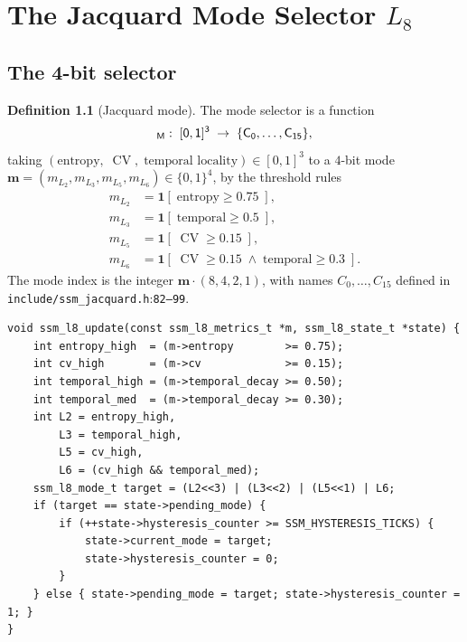 \documentclass[11pt,letterpaper,openany]{book}
\theoremstyle{definition}
\newtheorem{definition}{Definition}[chapter]
\theoremstyle{plain}
\newcommand{\CV}{\operatorname{CV}}
\newcommand{\Loop}[1]{L_{#1}}
\newcommand{\sourceref}[2]{\texttt{#1}:\texttt{#2}}
\begin{document}
\chapter{The Jacquard Mode Selector $\Loop{8}$}
\label{ch:jacquard}

\section{The 4-bit selector}

\begin{definition}[Jacquard mode]\label{def:jacquard}
The mode selector is a function
\[
  \sf_M:\;[0,1]^3 \;\to\; \{C_0,\dots,C_{15}\},
\]
taking $(\text{entropy},\;\CV,\;\text{temporal locality})\in [0,1]^3$ to a
$4$-bit mode $\mathbf{m} = (m_{\Loop{2}},m_{\Loop{3}},m_{\Loop{5}},m_{\Loop{6}})
\in\{0,1\}^4$, by the threshold rules
\begin{align*}
  m_{\Loop{2}} &= \mathbf{1}[\;\text{entropy} \ge 0.75\;],\\
  m_{\Loop{3}} &= \mathbf{1}[\;\text{temporal} \ge 0.5\;],\\
  m_{\Loop{5}} &= \mathbf{1}[\;\CV \ge 0.15\;],\\
  m_{\Loop{6}} &= \mathbf{1}[\;\CV \ge 0.15\;\wedge\;\text{temporal} \ge 0.3\;].
\end{align*}
The mode index is the integer
$\mathbf{m}\cdot(8,4,2,1)$, with names $C_0,\dots,C_{15}$ defined in
\sourceref{include/ssm\_jacquard.h}{82--99}.
\end{definition}

\begin{lstlisting}[caption={Mode update
  (\texttt{src/ssm\_jacquard.c}:65--110).}]
void ssm_l8_update(const ssm_l8_metrics_t *m, ssm_l8_state_t *state) {
    int entropy_high  = (m->entropy        >= 0.75);
    int cv_high       = (m->cv             >= 0.15);
    int temporal_high = (m->temporal_decay >= 0.50);
    int temporal_med  = (m->temporal_decay >= 0.30);
    int L2 = entropy_high,
        L3 = temporal_high,
        L5 = cv_high,
        L6 = (cv_high && temporal_med);
    ssm_l8_mode_t target = (L2<<3) | (L3<<2) | (L5<<1) | L6;
    if (target == state->pending_mode) {
        if (++state->hysteresis_counter >= SSM_HYSTERESIS_TICKS) {
            state->current_mode = target;
            state->hysteresis_counter = 0;
        }
    } else { state->pending_mode = target; state->hysteresis_counter = 1; }
}
\end{lstlisting}
\end{document}
